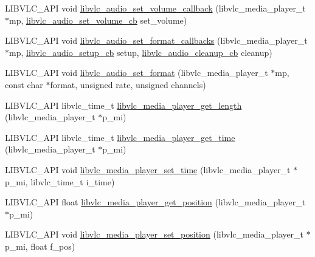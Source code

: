 \begin{DoxyCompactItemize}
\item 
L\+I\+B\+V\+L\+C\+\_\+\+A\+PI void \hyperlink{group__libvlc__media__player_gaabd876baf98d23a49ad55b2cd53e81b9}{libvlc\+\_\+audio\+\_\+set\+\_\+volume\+\_\+callback} (libvlc\+\_\+media\+\_\+player\+\_\+t $\ast$mp, \hyperlink{group__libvlc__media__player_ga1f41552fa452e3d5d53d079485eb0749}{libvlc\+\_\+audio\+\_\+set\+\_\+volume\+\_\+cb} set\+\_\+volume)
\item 
L\+I\+B\+V\+L\+C\+\_\+\+A\+PI void \hyperlink{group__libvlc__media__player_gae1c8bcbd10157da11331e46d30ecd058}{libvlc\+\_\+audio\+\_\+set\+\_\+format\+\_\+callbacks} (libvlc\+\_\+media\+\_\+player\+\_\+t $\ast$mp, \hyperlink{group__libvlc__media__player_gaa8c228a30286c9b0b26ad436d69e6f8b}{libvlc\+\_\+audio\+\_\+setup\+\_\+cb} setup, \hyperlink{group__libvlc__media__player_ga90303960d8c56bc1cd9902e80b011843}{libvlc\+\_\+audio\+\_\+cleanup\+\_\+cb} cleanup)
\item 
L\+I\+B\+V\+L\+C\+\_\+\+A\+PI void \hyperlink{group__libvlc__media__player_gaf7af18f5f09e34234e5f1bf4681dfe43}{libvlc\+\_\+audio\+\_\+set\+\_\+format} (libvlc\+\_\+media\+\_\+player\+\_\+t $\ast$mp, const char $\ast$format, unsigned rate, unsigned channels)
\item 
L\+I\+B\+V\+L\+C\+\_\+\+A\+PI libvlc\+\_\+time\+\_\+t \hyperlink{group__libvlc__media__player_ga057b0d82fb84f60ee24a6d76c1f135f3}{libvlc\+\_\+media\+\_\+player\+\_\+get\+\_\+length} (libvlc\+\_\+media\+\_\+player\+\_\+t $\ast$p\+\_\+mi)
\item 
L\+I\+B\+V\+L\+C\+\_\+\+A\+PI libvlc\+\_\+time\+\_\+t \hyperlink{group__libvlc__media__player_ga1a5ccaa2c044ded47205cd0754f68370}{libvlc\+\_\+media\+\_\+player\+\_\+get\+\_\+time} (libvlc\+\_\+media\+\_\+player\+\_\+t $\ast$p\+\_\+mi)
\item 
L\+I\+B\+V\+L\+C\+\_\+\+A\+PI void \hyperlink{group__libvlc__media__player_ga2f3347645100660ffae553387171e398}{libvlc\+\_\+media\+\_\+player\+\_\+set\+\_\+time} (libvlc\+\_\+media\+\_\+player\+\_\+t $\ast$p\+\_\+mi, libvlc\+\_\+time\+\_\+t i\+\_\+time)
\item 
L\+I\+B\+V\+L\+C\+\_\+\+A\+PI float \hyperlink{group__libvlc__media__player_gaa6ee9d95f5b6ee0c34b92ab8c86a5c1c}{libvlc\+\_\+media\+\_\+player\+\_\+get\+\_\+position} (libvlc\+\_\+media\+\_\+player\+\_\+t $\ast$p\+\_\+mi)
\item 
L\+I\+B\+V\+L\+C\+\_\+\+A\+PI void \hyperlink{group__libvlc__media__player_ga4b672fe24ed2defbf732452d5ccbb4ac}{libvlc\+\_\+media\+\_\+player\+\_\+set\+\_\+position} (libvlc\+\_\+media\+\_\+player\+\_\+t $\ast$p\+\_\+mi, float f\+\_\+pos)

\end{DoxyCompactItemize}
